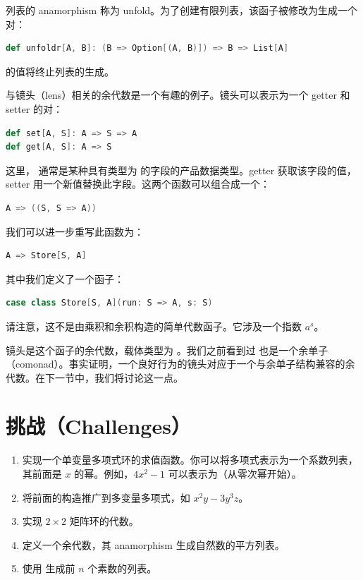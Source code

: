 列表的 anamorphism 称为 unfold。为了创建有限列表，该函子被修改为生成一个  对：

\begin{lstlisting}[language=Scala]
def unfoldr[A, B]: (B => Option[(A, B)]) => B => List[A]
\end{lstlisting}
 的值将终止列表的生成。

与镜头（lens）相关的余代数是一个有趣的例子。镜头可以表示为一个 getter 和 setter 的对：

\begin{lstlisting}[language=Scala]
def set[A, S]: A => S => A
def get[A, S]: A => S
\end{lstlisting}
这里， 通常是某种具有类型为  的字段的产品数据类型。getter 获取该字段的值，setter 用一个新值替换此字段。这两个函数可以组合成一个：

\begin{lstlisting}[language=Scala]
A => ((S, S => A))
\end{lstlisting}
我们可以进一步重写此函数为：

\begin{lstlisting}[language=Scala]
A => Store[S, A]
\end{lstlisting}
其中我们定义了一个函子：

\begin{lstlisting}[language=Scala]
case class Store[S, A](run: S => A, s: S)
\end{lstlisting}
请注意，这不是由乘积和余积构造的简单代数函子。它涉及一个指数 $a^s$。

镜头是这个函子的余代数，载体类型为 。我们之前看到过  也是一个余单子（comonad）。事实证明，一个良好行为的镜头对应于一个与余单子结构兼容的余代数。在下一节中，我们将讨论这一点。

\section{挑战（Challenges）}

\begin{enumerate}
  \tightlist
  \item
  实现一个单变量多项式环的求值函数。你可以将多项式表示为一个系数列表，其前面是 $x$ 的幂。例如，$4x^2-1$ 可以表示为（从零次幂开始）\code{{[}-1, 0, 4{]}}。
  \item
  将前面的构造推广到多变量多项式，如 $x^2y-3y^3z$。
  \item
  实现 $2\times{}2$ 矩阵环的代数。
  \item
  定义一个余代数，其 anamorphism 生成自然数的平方列表。
  \item
  使用  生成前 $n$ 个素数的列表。
\end{enumerate}

